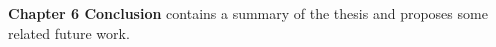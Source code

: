 
\textbf{Chapter 6 Conclusion} contains a summary of the thesis and proposes some related future work.

\begin{comment}
\section{Challenges Presented}

What criteria needs to be met for the thesis to have met its goal?  Ie - the learning environment must have the following characteristics:

\begin{itemize}
	\item Easy to learn and use
	\item Allows new programmers to grasp fundamental programming concepts
	\item etc etc etc
\end{itemize}

\section{Approach}

\begin{itemize}
	\item Evaluation of GC via CG framework
	\item Development of Word game framework and exercises
\end{itemize}

\end{comment}

\begin{comment}
Why is this thesis useful?

Programming is hard, students new to programming often struggle to cope with the complexities of software development.

Declining enrollment, syntax errors discourage students early and thus they leave computer science before they've
gotten anywhere in the discipline...

It has been theorized that visual programming environments (VPE's) help to alleviate some of the early frustrations
associated with learning to program.  Many examples include Alice, Scratch, FIXME more...., however, very few have
been proposed that fall into the functional programming paradigm.  Why FP?
\end{comment}